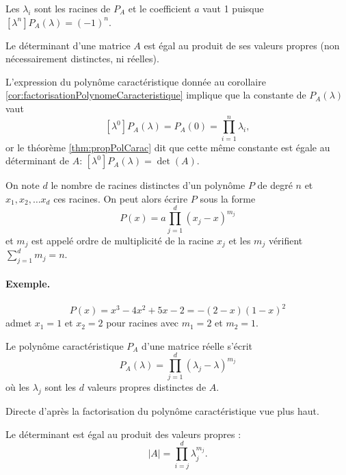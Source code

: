 \proof
Les $\lambda_i$ sont les racines de $P_A$ et le coefficient $a$ vaut 1 puisque $[\lambda^n]P_A(\lambda) = (-1)^n$.
\eproof

\begin{corollary*}
  Le déterminant d'une matrice $A$ est égal au produit de ses valeurs propres  (non nécessairement distinctes, ni réelles).
\end{corollary*}

\proof
L'expression du polynôme caractéristique donnée au corollaire \ref{cor:factorisationPolynomeCaracteristique} implique que la constante de $P_A(\lambda)$ vaut 
$$
[\lambda^0]P_A(\lambda) = P_A(0) = \prod_{i=1}^n \lambda_i,
$$
or le théorème \ref{thm:propPolCarac} dit que cette même constante est égale au déterminant de $A$: $[\lambda^0]P_A(\lambda) = \det(A)$.
\eproof

\begin{definition}
  On note $d$ le nombre de racines distinctes d'un polynôme $P$ de degré $n$ et $x_1, x_2, \dots x_d$ ces racines. On peut alors écrire $P$ sous la forme
  $$
  P(x) = a \prod_{j=1}^d (x_j - x)^{m_j}
  $$
  et $m_j$ est appelé ordre de multiplicité de la racine $x_j$ et les $m_j$ vérifient $ \sum_{j=1}^d m_j = n$.
\end{definition}

\paragraph*{Exemple.} 
$$
P(x) = x^3 - 4x^2 + 5x - 2 = - (2-x)(1-x)^2
$$ 
admet $x_1 = 1$ et $x_2 = 2$ pour racines avec $m_1 = 2$ et $m_2 = 1$.


\begin{corollary*}
  Le polynôme caractéristique $P_A$ d'une matrice réelle s'écrit
  $$
  P_A(\lambda) = \prod_{j=1}^d (\lambda_j - \lambda)^{m_j}
  $$
  où les $\lambda_j$ sont les $d$ valeurs propres distinctes de $A$.
\end{corollary*}

\proof
Directe d'après la factorisation du polynôme caractéristique vue plus haut.\eproof

\begin{corollary*}
  Le déterminant est égal au produit des valeurs propres : 
  $$
  |A| = \prod_{i=j}^d \lambda_j^{m_j}.
  $$
\end{corollary*}


